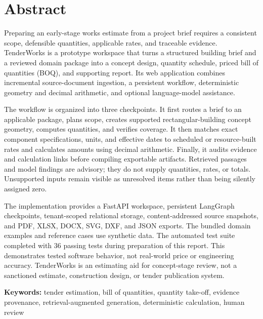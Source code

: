 \section*{Abstract}
Preparing an early-stage works estimate from a project brief requires a consistent scope, defensible quantities, applicable rates, and traceable evidence. TenderWorks is a prototype workspace that turns a structured building brief and a reviewed domain package into a concept design, quantity schedule, priced bill of quantities (BOQ), and supporting report. Its web application combines incremental source-document ingestion, a persistent workflow, deterministic geometry and decimal arithmetic, and optional language-model assistance.

The workflow is organized into three checkpoints. It first routes a brief to an applicable package, plans scope, creates supported rectangular-building concept geometry, computes quantities, and verifies coverage. It then matches exact component specifications, units, and effective dates to scheduled or resource-built rates and calculates amounts using decimal arithmetic. Finally, it audits evidence and calculation links before compiling exportable artifacts. Retrieved passages and model findings are advisory; they do not supply quantities, rates, or totals. Unsupported inputs remain visible as unresolved items rather than being silently assigned zero.

The implementation provides a FastAPI workspace, persistent LangGraph checkpoints, tenant-scoped relational storage, content-addressed source snapshots, and PDF, XLSX, DOCX, SVG, DXF, and JSON exports. The bundled domain examples and reference cases use synthetic data. The automated test suite completed with 36 passing tests during preparation of this report. This demonstrates tested software behavior, not real-world price or engineering accuracy. TenderWorks is an estimating aid for concept-stage review, not a sanctioned estimate, construction design, or tender publication system.

\noindent\textbf{Keywords:} tender estimation, bill of quantities, quantity take-off, evidence provenance, retrieval-augmented generation, deterministic calculation, human review
\clearpage
